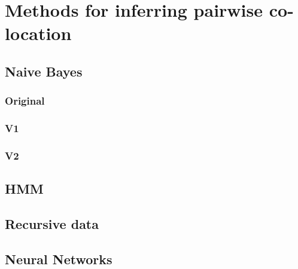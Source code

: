 \chapter{Methods for inferring pairwise co-location}

\section{Naive Bayes}
\subsection{Original}
\subsection{V1} 	
\subsection{V2}

\section{HMM}

\section{Recursive data}

\section{Neural Networks}